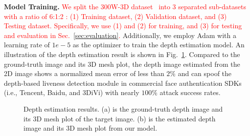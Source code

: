 \textbf{Model Training.}
\textcolor{red}{We split the 300W-3D dataset~\cite{zhu2016face} into 3 separated sub-datasets with a ratio of 6:1:2 : (1) Training dataset, (2) Validation dataset, and (3) Testing dataset. Specifically, we use (1) and (2) for training, and (3) for testing and evaluation in Sec.~\ref{sec:evaluation}. } 
Additionally, we employ Adam with a learning rate of $1e{-}5$  as the optimizer to train the depth estimation model. An illustration of the depth estimation result is shown in Fig.~\ref{estimation_result}. Compared to the ground-truth image and its 3D mesh plot, the depth image estimated from the 2D image shows a normalized mean error of less than $2\%$ and can spoof the depth-based liveness detection module in commercial face authentication SDKs (i.e., Tencent, Baidu, and 3DiVi) with nearly $100\%$ attack success rates.




\begin{figure}[!t]
	\centering
	\vspace{-0.1in}
	\caption{Depth estimation results. (a) is the ground-truth depth image and its 3D mesh plot of the target image. (b) is the estimated depth image and its 3D mesh plot from our model.}
	\label{estimation_result}
\vspace{-0.15in}
\end{figure}

